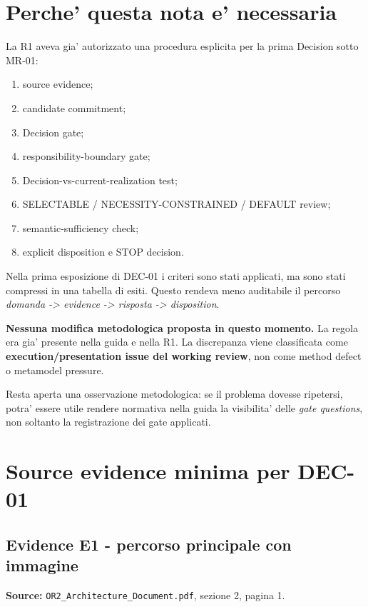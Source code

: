 \documentclass[11pt,a4paper]{article}
\begin{document}
\section{Perche' questa nota e' necessaria}

La R1 aveva gia' autorizzato una procedura esplicita per la prima Decision sotto MR-01:
\begin{enumerate}
  \item source evidence;
  \item candidate commitment;
  \item Decision gate;
  \item responsibility-boundary gate;
  \item Decision-vs-current-realization test;
  \item SELECTABLE / NECESSITY-CONSTRAINED / DEFAULT review;
  \item semantic-sufficiency check;
  \item explicit disposition e STOP decision.
\end{enumerate}

Nella prima esposizione di DEC-01 i criteri sono stati applicati, ma sono stati compressi in una tabella di esiti. Questo rendeva meno auditabile il percorso \emph{domanda -> evidence -> risposta -> disposition}.

\begin{ddtacore}[title={Classificazione della discrepanza}]
\textbf{Nessuna modifica metodologica proposta in questo momento.}
La regola era gia' presente nella guida e nella R1. La discrepanza viene classificata come \textbf{execution/presentation issue del working review}, non come method defect o metamodel pressure.
\end{ddtacore}

Resta aperta una osservazione metodologica: se il problema dovesse ripetersi, potra' essere utile rendere normativa nella guida la visibilita' delle \emph{gate questions}, non soltanto la registrazione dei gate applicati.

\section{Source evidence minima per DEC-01}

\subsection{Evidence E1 - percorso principale con immagine}
\textbf{Source:} \texttt{OR2\_Architecture\_Document.pdf}, sezione 2, pagina 1.
\end{document}
